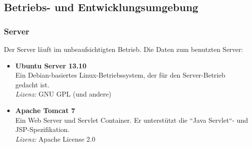 \subsection{Betriebs- und Entwicklungsumgebung}


\subsubsection{Server}
Der Server läuft im unbeaufsichtigten Betrieb. Die Daten zum benutzten Server:
\begin{itemize}
	\item \textbf{Ubuntu Server 13.10} \\
	Ein Debian-basiertes Linux-Betriebssystem, der für den Server-Betrieb gedacht ist. \\
	\textit{Lizenz:} GNU GPL (und andere)
	\item \textbf{Apache Tomcat 7} \\
	Ein Web Server und Servlet Container. Er unterstützt die ``Java Servlet``-  und JSP-Spezifikation. \\
	\textit{Lizenz:} Apache License 2.0
\end{itemize}

